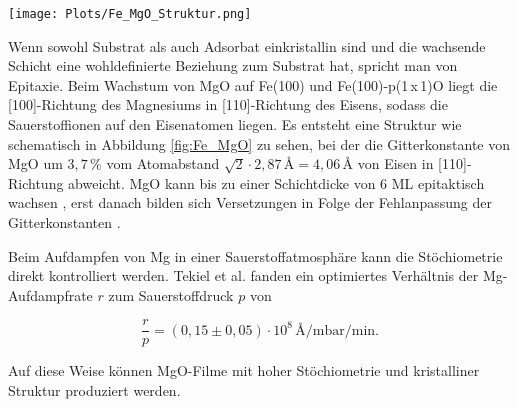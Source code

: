 \begin{SCfigure}
    \centering
    \texttt{[image: Plots/Fe\_MgO\_Struktur.png]}
    \caption{Anordnung einer Lage MgO auf Fe(100) in der Draufsicht. Die Sauerstoffionen liegen auf den Eisenatomen, während die Magnesiumionen 
    nach der NaCl-Struktur von MgO zwischen den Sauerstoffplätzen liegen.
    Die Richtungsangaben beziehen sich auf das Fe-System \cite{meyerheim2001geometrical}.}
    \label{fig:Fe_MgO}
\end{SCfigure}

Wenn sowohl Substrat als auch Adsorbat einkristallin sind 
und die wachsende Schicht eine wohldefinierte Beziehung zum Substrat hat, spricht man von Epitaxie.
Beim Wachstum von MgO auf Fe(100) und Fe(100)-p(1\,x\,1)O liegt die [100]-Richtung des Magnesiums in [110]-Richtung 
des Eisens, sodass die Sauerstoffionen auf den Eisenatomen liegen. Es entsteht eine Struktur wie schematisch in Abbildung \ref{fig:Fe_MgO} zu sehen, bei der 
die Gitterkonstante von MgO um $3,7\,\si{\percent}$ vom Atomabstand $\sqrt{2}\cdot 2,87\,\si{\angstrom}=4,06\,\si{\angstrom}$ von Eisen in [110]-Richtung abweicht. 
MgO kann bis zu einer Schichtdicke von 6 ML epitaktisch wachsen \cite{klaua2001growth}, erst danach bilden sich Versetzungen in Folge der 
Fehlanpassung der Gitterkonstanten \cite{dynna1996low}.

Beim Aufdampfen von Mg in einer Sauerstoffatmosphäre kann die Stöchiometrie direkt kontrolliert werden. 
Tekiel et al. \cite{tekiel2013reactive} fanden ein optimiertes Verhältnis der Mg-Aufdampfrate $r$ zum Sauerstoffdruck $p$ von 

\begin{equation}
    \dfrac{r}{p}=(0,15\pm 0,05)\cdot 10^8 \,\si{\angstrom\per\milli\bar\per\minute}.
    \label{eq:V1}
\end{equation}

Auf diese Weise können MgO-Filme mit hoher Stöchiometrie und kristalliner Struktur produziert werden.